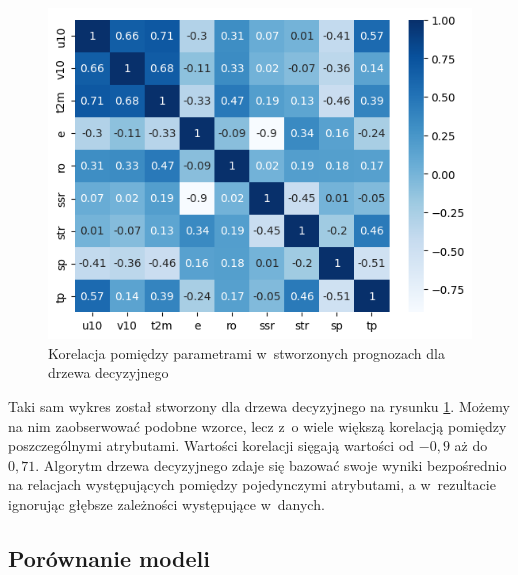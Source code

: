 \begin{figure}[H]
    \centering
    \includegraphics[width=\textwidth]{images/dt_corr_matrix.png}
    \caption[Korelacja dla drzewa decyzyjnego]{Korelacja pomiędzy parametrami w~stworzonych prognozach dla drzewa decyzyjnego}
    \label{dt-corr-matrix}
\end{figure}

Taki sam wykres został stworzony dla drzewa decyzyjnego na rysunku \ref{dt-corr-matrix}. Możemy na nim 
zaobserwować podobne wzorce, lecz z~o wiele większą korelacją pomiędzy poszczególnymi atrybutami. 
Wartości korelacji sięgają wartości od $-0,9$ aż do $0,71$. Algorytm drzewa decyzyjnego zdaje się 
bazować swoje wyniki bezpośrednio na relacjach występujących pomiędzy pojedynczymi atrybutami,
a w~rezultacie ignorując głębsze zależności występujące w~danych.



\subsection{Porównanie modeli}


